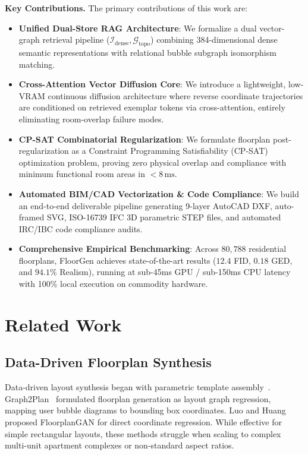 \documentclass[journal]{IEEEtran}
\begin{document}
\noindent\textbf{Key Contributions.} The primary contributions of this work are:
\begin{itemize}
    \item \textbf{Unified Dual-Store RAG Architecture}: We formalize a dual vector-graph retrieval pipeline ($\mathcal{I}_{\mathrm{dense}}, \mathcal{G}_{\mathrm{topo}}$) combining 384-dimensional dense semantic representations with relational bubble subgraph isomorphism matching.
    \item \textbf{Cross-Attention Vector Diffusion Core}: We introduce a lightweight, low-VRAM continuous diffusion architecture where reverse coordinate trajectories are conditioned on retrieved exemplar tokens via cross-attention, entirely eliminating room-overlap failure modes.
    \item \textbf{CP-SAT Combinatorial Regularization}: We formulate floorplan post-regularization as a Constraint Programming Satisfiability (CP-SAT) optimization problem, proving zero physical overlap and compliance with minimum functional room areas in $< 8\,\mathrm{ms}$.
    \item \textbf{Automated BIM/CAD Vectorization \& Code Compliance}: We build an end-to-end deliverable pipeline generating 9-layer AutoCAD DXF, auto-framed SVG, ISO-16739 IFC 3D parametric STEP files, and automated IRC/IBC code compliance audits.
    \item \textbf{Comprehensive Empirical Benchmarking}: Across $80{,}788$ residential floorplans, FloorGen achieves state-of-the-art results ($12.4$ FID, $0.18$ GED, and $94.1\%$ Realism), running at sub-45ms GPU / sub-150ms CPU latency with 100\% local execution on commodity hardware.
\end{itemize}

\section{Related Work}

\subsection{Data-Driven Floorplan Synthesis}
Data-driven layout synthesis began with parametric template assembly~\cite{wu2019data}. Graph2Plan~\cite{hu2020graph2plan} formulated floorplan generation as layout graph regression, mapping user bubble diagrams to bounding box coordinates. Luo and Huang~\cite{luo2022floorplangan} proposed FloorplanGAN for direct coordinate regression. While effective for simple rectangular layouts, these methods struggle when scaling to complex multi-unit apartment complexes or non-standard aspect ratios.
\end{document}

